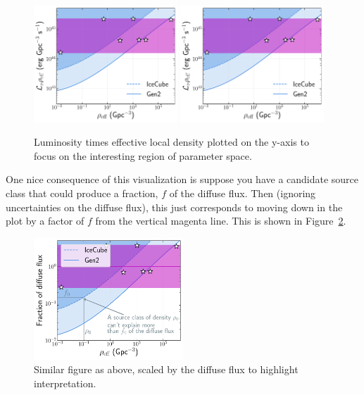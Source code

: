 \begin{figure}
    \centering
    \includegraphics[width=0.48\textwidth]{figures/rotated_phase_space/lumi_density_product.pdf}
    \includegraphics[width=0.48\textwidth]{figures/rotated_phase_space/lumi_density_product_hatch.pdf}
    \caption[Suggested visualization of luminosity-density parameter space]{Luminosity times effective local density plotted on the y-axis to focus on the interesting region of parameter space.}
    \label{fig:rotate_scaled_lumi_density}
\end{figure}

One nice consequence of this visualization is suppose you have a candidate source class that could produce a fraction, $f$ of the diffuse flux. Then (ignoring uncertainties on the diffuse flux), this just corresponds to moving down in the plot by a factor of $f$ from the vertical magenta line. This is shown in Figure~\ref{fig:rotate_diffuse_fraction_lumi}. 

\begin{figure}[h!]
    \centering
    \includegraphics[width=0.5\textwidth]{figures/rotated_phase_space/lumi_density_fraction.pdf}
    \caption[Source number density phase space relative to diffuse flux]{Similar figure as above, scaled by the diffuse flux to highlight interpretation.}
    \label{fig:rotate_diffuse_fraction_lumi}
\end{figure} 